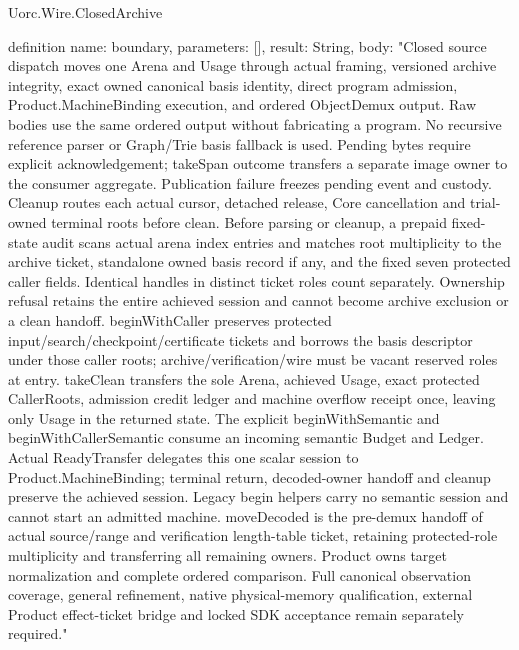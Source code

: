 \begin{lexlean}{Uorc.Wire.ClosedArchive}
\begin{semanticmodule}
definition{
  name: boundary,
  parameters: [],
  result: String,
  body: "Closed source dispatch moves one Arena and Usage through actual framing, versioned archive integrity, exact owned canonical basis identity, direct program admission, Product.MachineBinding execution, and ordered ObjectDemux output. Raw bodies use the same ordered output without fabricating a program. No recursive reference parser or Graph/Trie basis fallback is used. Pending bytes require explicit acknowledgement; takeSpan outcome transfers a separate image owner to the consumer aggregate. Publication failure freezes pending event and custody. Cleanup routes each actual cursor, detached release, Core cancellation and trial-owned terminal roots before clean. Before parsing or cleanup, a prepaid fixed-state audit scans actual arena index entries and matches root multiplicity to the archive ticket, standalone owned basis record if any, and the fixed seven protected caller fields. Identical handles in distinct ticket roles count separately. Ownership refusal retains the entire achieved session and cannot become archive exclusion or a clean handoff. beginWithCaller preserves protected input/search/checkpoint/certificate tickets and borrows the basis descriptor under those caller roots; archive/verification/wire must be vacant reserved roles at entry. takeClean transfers the sole Arena, achieved Usage, exact protected CallerRoots, admission credit ledger and machine overflow receipt once, leaving only Usage in the returned state. The explicit beginWithSemantic and beginWithCallerSemantic consume an incoming semantic Budget and Ledger. Actual ReadyTransfer delegates this one scalar session to Product.MachineBinding; terminal return, decoded-owner handoff and cleanup preserve the achieved session. Legacy begin helpers carry no semantic session and cannot start an admitted machine. moveDecoded is the pre-demux handoff of actual source/range and verification length-table ticket, retaining protected-role multiplicity and transferring all remaining owners. Product owns target normalization and complete ordered comparison. Full canonical observation coverage, general refinement, native physical-memory qualification, external Product effect-ticket bridge and locked SDK acceptance remain separately required."
}
\end{semanticmodule}
\end{lexlean}
